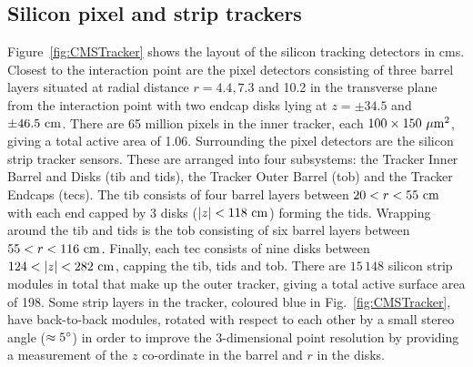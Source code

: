 \subsection{Silicon pixel and strip trackers}
\label{ssec:Tracker}

Figure~\ref{fig:CMSTracker} shows the layout of the silicon tracking detectors in \acrshort{cms}. 
Closest to the interaction point are the pixel detectors consisting of three barrel layers situated at radial distance $r=4.4, 7.3$ and 10.2\cm{} in the transverse plane from the interaction point with two endcap disks lying at $z=\pm34.5$ and $\pm46.5\mathrm{~cm}^{}$.  
There are 65 million pixels in the inner tracker, each $100\times150\mathrm{~\mu m}^{2}$, giving a total active area of 1.06\msq{}.
Surrounding the pixel detectors are the silicon strip tracker sensors. 
These are arranged into four subsystems: the Tracker Inner Barrel and Disks (\acrshort{tib} and \acrshort{tid}s), the Tracker Outer Barrel (\acrshort{tob}) and the Tracker Endcaps (\acrshort{tec}s).
The \acrshort{tib} consists of four barrel layers between $20<r<55\mathrm{~cm}^{}$ with each end capped by 3 disks ($|z|<118\mathrm{~cm}^{}$) forming the \acrshort{tid}s. 
Wrapping around the \acrshort{tib} and \acrshort{tid}s is the \acrshort{tob} consisting of six barrel layers between $55<r<116\mathrm{~cm}^{}$. 
Finally, each \acrshort{tec} consists of nine disks between $124<|z|<282\cm$, capping the \acrshort{tib}, \acrshort{tid}s and \acrshort{tob}.
There are $15\,148$ silicon strip modules in total that make up the outer tracker, giving a total active surface area of 198\msq{}. 
Some strip layers in the tracker, coloured blue in Fig.~\ref{fig:CMSTracker}, have back-to-back modules, rotated with respect to each other by a small stereo angle ($\approx5^\circ$) in order to improve the 3-dimensional point resolution by providing a measurement of the $z$ co-ordinate in the barrel and $r$ in the disks.

